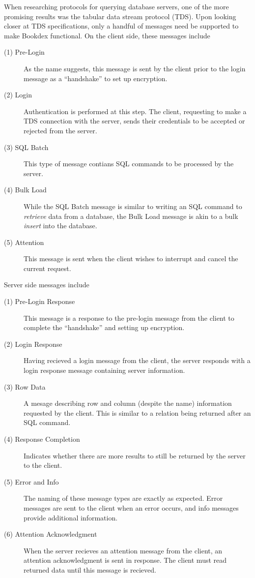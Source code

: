 \documentclass[12pt]{article}
\begin{document}
When researching protocols for querying database servers, one of the more promising results was the tabular data stream protocol (TDS)\cite{tds}. Upon looking closer at TDS specifications, only a handful of messages need be supported to make Bookdex functional. On the client side, these messages include 

\begin{description}
    \item[(1) Pre-Login] As the name suggests, this message is sent by the client prior to the login message as a ``handshake'' to set up encryption.
    \item[(2) Login] Authentication is performed at this step. The client, requesting to make a TDS connection with the server, sends their credentials to be accepted or rejected from the server.
    \item[(3) SQL Batch] This type of message contians SQL commands to be processed by the server.
    \item[(4) Bulk Load] While the SQL Batch message is similar to writing an SQL command to \textit{retrieve} data from a database, the Bulk Load message is akin to a bulk \textit{insert} into the database.
    \item[(5) Attention] This message is sent when the client wishes to interrupt and cancel the current request.
\end{description}

Server side messages include

\begin{description}
    \item[(1) Pre-Login Response] This message is a response to the pre-login message from the client to complete the ``handshake'' and setting up encryption.
    \item[(2) Login Response] Having recieved a login message from the client, the server responds with a login response message containing server information.
    \item[(3) Row Data] A mesage describing row and column (despite the name) information requested by the client. This is similar to a relation being returned after an SQL command.
    \item[(4) Response Completion] Indicates whether there are more results to still be returned by the server to the client.
    \item[(5) Error and Info] The naming of these message types are exactly as expected. Error messages are sent to the client when an error occurs, and info messages provide additional information.
    \item[(6) Attention Acknowledgment] When the server recieves an attention message from the client, an attention acknowledgment is sent in response. The client must read returned data until this message is recieved.
\end{description}
\end{document}
